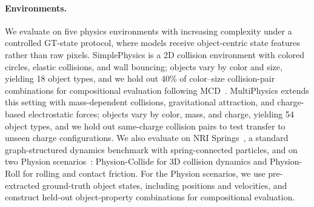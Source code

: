 \documentclass{article}
\begin{document}

\paragraph{Environments.}
We evaluate on five physics environments with increasing complexity under a controlled GT-state protocol, where models receive object-centric state features rather than raw pixels. SimplePhysics is a 2D collision environment with colored circles, elastic collisions, and wall bouncing; objects vary by color and size, yielding 18 object types, and we hold out 40\% of color--size collision-pair combinations for compositional evaluation following MCD~\citep{keysers2020measuring}. MultiPhysics extends this setting with mass-dependent collisions, gravitational attraction, and charge-based electrostatic forces; objects vary by color, mass, and charge, yielding 54 object types, and we hold out same-charge collision pairs to test transfer to unseen charge configurations. We also evaluate on NRI Springs~\citep{kipf2018nri}, a standard graph-structured dynamics benchmark with spring-connected particles, and on two Physion scenarios~\citep{bear2021physion}: Physion-Collide for 3D collision dynamics and Physion-Roll for rolling and contact friction. For the Physion scenarios, we use pre-extracted ground-truth object states, including positions and velocities, and construct held-out object-property combinations for compositional evaluation.
\end{document}
